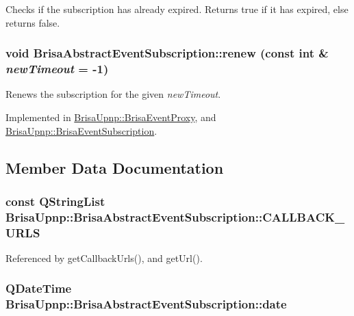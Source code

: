 Checks if the subscription has already expired. Returns true if it has expired, else returns false. \hypertarget{classBrisaUpnp_1_1BrisaAbstractEventSubscription_ae9da94244c6164b5759b8be21e03d42f}{
\subsubsection[{renew}]{\setlength{\rightskip}{0pt plus 5cm}void BrisaAbstractEventSubscription::renew (const int \& {\em newTimeout} = {\ttfamily -\/1})}}
\label{classBrisaUpnp_1_1BrisaAbstractEventSubscription_ae9da94244c6164b5759b8be21e03d42f}


Renews the subscription for the given {\itshape newTimeout\/}. 

Implemented in \hyperlink{classBrisaUpnp_1_1BrisaEventProxy_a9f700f55e37b646bf2cb2c26b98707d8}{BrisaUpnp::BrisaEventProxy}, and \hyperlink{classBrisaUpnp_1_1BrisaEventSubscription_aa5b51ef428760a2f3e653e9b4b132f5a}{BrisaUpnp::BrisaEventSubscription}.

\subsection{Member Data Documentation}
\hypertarget{classBrisaUpnp_1_1BrisaAbstractEventSubscription_a976193e5caf8de65f6ca6efb1e4f5587}{
\subsubsection[{CALLBACK\_\-URLS}]{\setlength{\rightskip}{0pt plus 5cm}const QStringList {\bf BrisaUpnp::BrisaAbstractEventSubscription::CALLBACK\_\-URLS}}}
\label{classBrisaUpnp_1_1BrisaAbstractEventSubscription_a976193e5caf8de65f6ca6efb1e4f5587}


Referenced by getCallbackUrls(), and getUrl().\hypertarget{classBrisaUpnp_1_1BrisaAbstractEventSubscription_ab85f792d439a9ae1f90aab4c7f3c9082}{
\subsubsection[{date}]{\setlength{\rightskip}{0pt plus 5cm}QDateTime {\bf BrisaUpnp::BrisaAbstractEventSubscription::date}}}
\label{classBrisaUpnp_1_1BrisaAbstractEventSubscription_ab85f792d439a9ae1f90aab4c7f3c9082}


